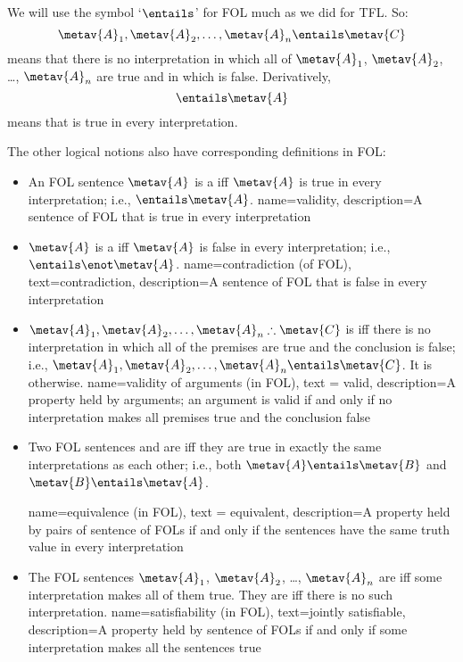We will use the symbol `$\entails$' for FOL much as we did for TFL. So:
	$$\metav{A}_1, \metav{A}_2, \ldots, \metav{A}_n \entails\metav{C}$$
means that there is no interpretation in which all of $\metav{A}_1$, $\metav{A}_2$, \dots, $\metav{A}_n$ are true and in which  is false. Derivatively,
	$$\entails\metav{A}$$
means that  is true in every interpretation.

The other logical notions also have corresponding definitions in FOL:

\begin{itemize}
\item An FOL sentence $\metav{A}$ is a  iff $\metav{A}$ is true in every interpretation; i.e.,  $\entails\metav{A}$.
{
name=validity,
description={A \gls{sentence of FOL} that is true in every \gls{interpretation}}
}

\item $\metav{A}$ is a  iff $\metav{A}$ is false in every interpretation; i.e., $\entails\enot\metav{A}$.
{
  name=contradiction (of FOL),
  text=contradiction,
description={A \gls{sentence of FOL} that is false in every \gls{interpretation}}
}
  
\item $\metav{A}_1, \metav{A}_2, \ldots, \metav{A}_n \therefore \metav{C}$ is  iff there is no interpretation in which all of the premises are true and the conclusion is false; i.e., $\metav{A}_1,\metav{A}_2,\ldots, \metav{A}_n \entails\metav{C}$. It is  otherwise.
{
  name=validity of arguments (in FOL),
  text = valid,
description={A property held by arguments; an argument is valid if and only if no \gls{interpretation} makes all premises true and the conclusion false}
}

\item Two FOL sentences  and  are  iff they are true in exactly the same interpretations as each other; i.e., both $\metav{A}\entails\metav{B}$ and $\metav{B}\entails\metav{A}$.

{
  name=equivalence (in FOL),
  text = equivalent,
description={A property held by pairs of \glspl{sentence of FOL} if and only if the sentences have the same truth value in every \gls{interpretation}}
}

\item The FOL sentences $\metav{A}_1$, $\metav{A}_2$, \dots, $\metav{A}_n$ are  iff some interpretation makes all of them true. They are  iff there is no such interpretation.
{
  name=satisfiability (in FOL),
  text=jointly satisfiable,
description={A property held by \glspl{sentence of FOL} if and only if some \gls{interpretation} makes all the sentences true}
}
\end{itemize}

